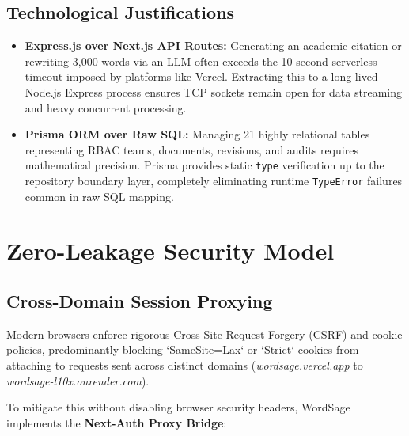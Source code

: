 \documentclass[12pt,a4paper]{report}
\begin{document}
\section{Technological Justifications}
\begin{itemize}[leftmargin=*]
    \item \textbf{Express.js over Next.js API Routes:} Generating an academic citation or rewriting 3,000 words via an LLM often exceeds the 10-second serverless timeout imposed by platforms like Vercel. Extracting this to a long-lived Node.js Express process ensures TCP sockets remain open for data streaming and heavy concurrent processing.
    \item \textbf{Prisma ORM over Raw SQL:} Managing 21 highly relational tables representing RBAC teams, documents, revisions, and audits requires mathematical precision. Prisma provides static \texttt{type} verification up to the repository boundary layer, completely eliminating runtime \texttt{TypeError} failures common in raw SQL mapping.
\end{itemize}

\chapter{Zero-Leakage Security Model}

\section{Cross-Domain Session Proxying}
Modern browsers enforce rigorous Cross-Site Request Forgery (CSRF) and cookie policies, predominantly blocking `SameSite=Lax` or `Strict` cookies from attaching to requests sent across distinct domains (\textit{wordsage.vercel.app} to \textit{wordsage-l10x.onrender.com}). 

To mitigate this without disabling browser security headers, WordSage implements the \textbf{Next-Auth Proxy Bridge}:
\end{document}
